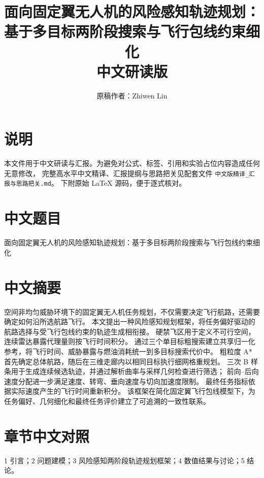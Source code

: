 \documentclass[12pt]{article}
\title{面向固定翼无人机的风险感知轨迹规划：基于多目标两阶段搜索与飞行包线约束细化\\中文研读版}
\author{原稿作者：Zhiwen Lin}
\begin{document}
\maketitle
\section*{说明}
本文件用于中文研读与汇报。为避免对公式、标签、引用和实验占位内容造成任何无意修改，
完整高水平中文精译、汇报提纲与思路把关见配套文件
\texttt{中文版精译\_汇报与思路把关.md}。
下附原始 \LaTeX{} 源码，便于逐式核对。
\section*{中文题目}
面向固定翼无人机的风险感知轨迹规划：基于多目标两阶段搜索与飞行包线约束细化
\section*{中文摘要}
空间非均匀威胁环境下的固定翼无人机任务规划，不仅需要决定飞行航路，还需要确定如何沿所选航路飞行。
本文提出一种风险感知规划框架，将任务偏好驱动的航路选择与受飞行包线约束的轨迹生成相衔接。
硬禁飞区用于定义不可行空间，连续雷达暴露代理量则按飞行时间积分。
通过三个单目标粗搜索建立共享归一化参考，将飞行时间、威胁暴露与燃油消耗统一到多目标搜索代价中。
粗粒度 A* 首先确定总体航路，随后在三维走廊内以相同目标执行细网格重规划。
三次 B 样条用于生成连续候选轨迹，并通过解析曲率与采样几何检查进行筛选；
前向--后向速度分配进一步满足速度、转弯、垂向速度与切向加速度限制。
最终任务指标依据实际速度产生的飞行时间重新积分。
该框架在简化固定翼飞行包线模型下，为任务偏好、几何细化和最终任务评价建立了可追溯的一致性联系。

\section*{章节中文对照}
1 引言；2 问题建模；3 风险感知两阶段轨迹规划框架；4 数值结果与讨论；5 结论。

\newpage
\end{document}
